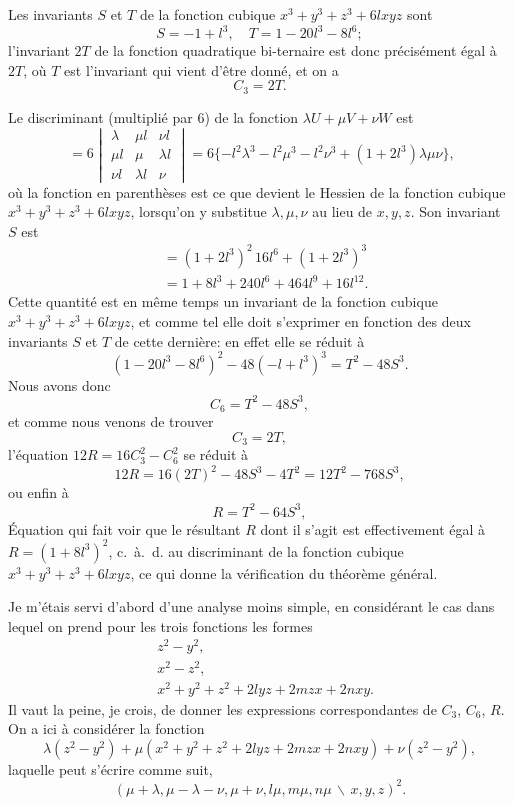 \documentclass[11pt,a4paper]{book}
\begin{document}
Les invariants $S$ et $T$ de la fonction cubique $x^{3} + y^{3} + z^{3} + 6lxyz$ sont
\[S = -1 + l^{3}, \quad T = 1 - 20l^{3} - 8l^{6};\]
l'invariant $2T$ de la fonction quadratique bi-ternaire est donc pr\'{e}cis\'{e}ment
\'{e}gal \`{a} $2T$, o\`{u} $T$ est l'invariant qui vient d'\^{e}tre donn\'{e}, et on a
\[C_{3} = 2T.\]

Le discriminant (multipli\'{e} par $6$) de la fonction $\lambda U + \mu V + \nu W$ est
\[\;= 6\begin{vmatrix}\lambda & \mu l & \nu l \\ \mu l & \mu & \lambda l \\ \nu l & \lambda l & \nu\end{vmatrix}
= 6\{-l^{2}\lambda^{3} - l^{2}\mu^{3} - l^{2}\nu^{3} + (1+2l^{3})\lambda\mu\nu\},\]
o\`{u} la fonction en parenth\`{e}ses est ce que devient le Hessien de la fonction cubique
$x^{3}+y^{3}+z^{3}+6lxyz$, lorsqu'on y substitue $\lambda, \mu, \nu$ au lieu de $x,y,z$. Son
invariant $S$ est
\begin{align*}
&= (1+2l^{3})^{2}\,16l^{6} + (1+2l^{3})^{3} \\
&= 1 + 8l^{3} + 240l^{6} + 464l^{9} + 16l^{12}.
\end{align*}
Cette quantit\'{e} est en m\^{e}me temps un invariant de la fonction cubique
$x^{3} + y^{3} + z^{3} + 6lxyz$, et comme tel elle doit s'exprimer en fonction des deux
invariants $S$ et $T$ de cette derni\`{e}re: en effet elle se r\'{e}duit \`{a}
\[(1-20l^{3}-8l^{6})^{2} - 48(-l+l^{3})^{3} = T^{2} - 48S^{3}.\]
Nous avons donc
\[C_{6} = T^{2} - 48S^{3},\]
et comme nous venons de trouver
\[C_{3} = 2T,\]
l'\'{e}quation $12R = 16C_{3}^{2} - C_{6}^{2}$ se r\'{e}duit \`{a}
\[12R = 16(2T)^{2} - 48S^{3} - 4T^{2} = 12T^{2} - 768S^{3},\]
ou enfin \`{a}
\[R = T^{2} - 64S^{3},\]
\'{E}quation qui fait voir que le r\'{e}sultant $R$ dont il s'agit est effectivement
\'{e}gal \`{a} $R = (1+8l^{3})^{2}$, c.~\`{a}.~d. au discriminant de la fonction cubique
$x^{3} + y^{3} + z^{3} + 6lxyz$, ce qui donne la v\'{e}rification du th\'{e}or\`{e}me g\'{e}n\'{e}ral.

Je m'\'{e}tais servi d'abord d'une analyse moins simple, en consid\'{e}rant le cas
dans lequel on prend pour les trois fonctions les formes
\[
\begin{aligned}
&z^{2} - y^{2},\\
&x^{2} - z^{2},\\
&x^{2} + y^{2} + z^{2} + 2lyz + 2mzx + 2nxy.
\end{aligned}
\]
Il vaut la peine, je crois, de donner les expressions correspondantes de $C_{3}$, $C_{6}$, $R$.
On a ici \`{a} consid\'{e}rer la fonction
\[\lambda(z^{2}-y^{2}) + \mu(x^{2}+y^{2}+z^{2}+2lyz+2mzx+2nxy) + \nu(z^{2}-y^{2}),\]
laquelle peut s'\'{e}crire comme suit,
\[(\mu+\lambda, \mu-\lambda-\nu, \mu+\nu, l\mu, m\mu, n\mu\,\backslash\!\!\,x,y,z)^{2}.\]
\end{document}
